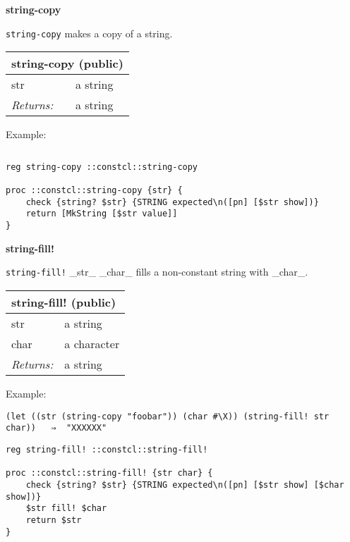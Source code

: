 \documentclass{report}
\begin{document}
\textbf{string-copy}


\texttt{string-copy} makes a copy of a string.

\begin{tabular}{ |l l| }
\hline
\multicolumn{2}{|l|}{string-copy (public)} \\
\hline
str & a string \\
\textit{Returns:} & a string \\
\hline
\end{tabular}


Example:

\noindent\makebox[\linewidth]{\rule{\linewidth}{0.4pt}}
\begin{lstlisting}
\end{lstlisting}
\noindent\makebox[\linewidth]{\rule{\linewidth}{0.4pt}}
\noindent\makebox[\linewidth]{\rule{\linewidth}{0.4pt}}
\begin{lstlisting}
reg string-copy ::constcl::string-copy
 
proc ::constcl::string-copy {str} {
    check {string? $str} {STRING expected\n([pn] [$str show])}
    return [MkString [$str value]]
}
\end{lstlisting}
\noindent\makebox[\linewidth]{\rule{\linewidth}{0.4pt}}

\textbf{string-fill!}


\texttt{string-fill!} \_str\_ \_char\_ fills a non-constant string with \_char\_.

\begin{tabular}{ |l l| }
\hline
\multicolumn{2}{|l|}{string-fill! (public)} \\
\hline
str & a string \\
char & a character \\
\textit{Returns:} & a string \\
\hline
\end{tabular}


Example:

\noindent\makebox[\linewidth]{\rule{\linewidth}{0.4pt}}
\begin{lstlisting}
(let ((str (string-copy "foobar")) (char #\X)) (string-fill! str char))   ⇒  "XXXXXX"
\end{lstlisting}
\noindent\makebox[\linewidth]{\rule{\linewidth}{0.4pt}}
\noindent\makebox[\linewidth]{\rule{\linewidth}{0.4pt}}
\begin{lstlisting}
reg string-fill! ::constcl::string-fill!
 
proc ::constcl::string-fill! {str char} {
    check {string? $str} {STRING expected\n([pn] [$str show] [$char show])}
    $str fill! $char
    return $str
}
\end{lstlisting}
\noindent\makebox[\linewidth]{\rule{\linewidth}{0.4pt}}
\end{document}
